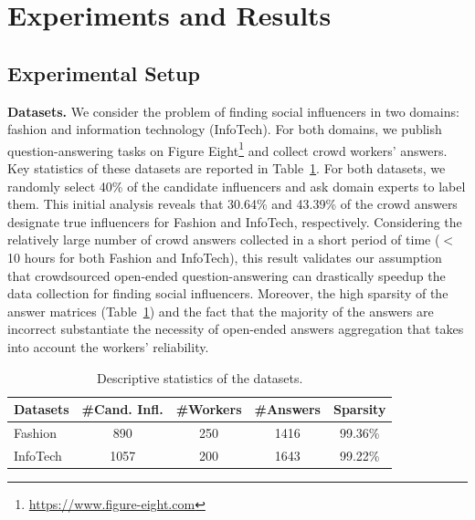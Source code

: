 \section{Experiments and Results}
\label{sec:result}

\subsection{Experimental Setup}

\noindent\textbf{Datasets.} We consider the problem of finding social influencers in two domains: fashion and information technology (InfoTech). For both domains, we publish question-answering tasks on Figure Eight\footnote{\url{https://www.figure-eight.com}} and collect crowd workers' answers. Key statistics of these datasets are reported in Table~\ref{tab:datasets}. For both datasets, we randomly select 40\% of the candidate influencers and ask domain experts to label them. This initial analysis reveals that 30.64\% and 43.39\%  of the crowd answers designate true influencers for Fashion and InfoTech, respectively. Considering the relatively large number of crowd answers collected in a short period of time ($<$10 hours for both Fashion and InfoTech), this result validates our assumption that crowdsourced open-ended question-answering can drastically speedup
the data collection for finding social influencers. Moreover, the high sparsity of the answer matrices (Table~\ref{tab:datasets}) and the fact that the majority of the answers are incorrect substantiate the necessity of open-ended answers aggregation that takes into account the workers' reliability.

\begin{table}[!ht]
\centering \caption{Descriptive statistics of the
datasets.}\label{tab:datasets}
\addtolength{\tabcolsep}{-1mm}
\begin{tabular}{lcccc}
\toprule
    Datasets & \textbf{\#Cand. Infl.} & \textbf{\#Workers} & \textbf{\#Answers} & \textbf{Sparsity}   \\\midrule
    Fashion & 890 & 250 & 1416  & 99.36\% \\
    InfoTech & 1057 & 200 &1643 & 99.22\% \\
\bottomrule
\end{tabular}
\end{table}

